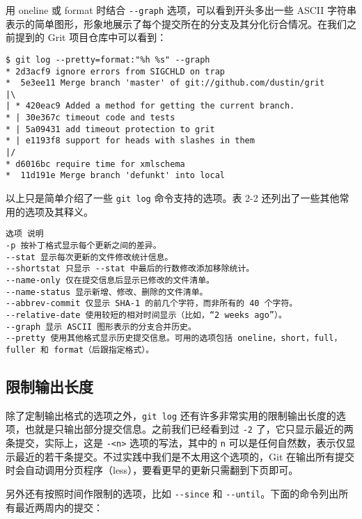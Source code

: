 \documentclass[a4paper]{book}
\begin{document}
用 oneline 或 format 时结合 \texttt{-{}-graph} 选项，可以看到开头多出一些 ASCII 字符串表示的简单图形，形象地展示了每个提交所在的分支及其分化衍合情况。在我们之前提到的 Grit 项目仓库中可以看到：

\begin{shaded}\begin{verbatim}
$ git log --pretty=format:"%h %s" --graph
* 2d3acf9 ignore errors from SIGCHLD on trap
*  5e3ee11 Merge branch 'master' of git://github.com/dustin/grit
|\
| * 420eac9 Added a method for getting the current branch.
* | 30e367c timeout code and tests
* | 5a09431 add timeout protection to grit
* | e1193f8 support for heads with slashes in them
|/
* d6016bc require time for xmlschema
*  11d191e Merge branch 'defunkt' into local
\end{verbatim}\end{shaded}

以上只是简单介绍了一些 \texttt{git log} 命令支持的选项。表 2-2 还列出了一些其他常用的选项及其释义。

\begin{shaded}\begin{verbatim}
选项 说明
-p 按补丁格式显示每个更新之间的差异。
--stat 显示每次更新的文件修改统计信息。
--shortstat 只显示 --stat 中最后的行数修改添加移除统计。
--name-only 仅在提交信息后显示已修改的文件清单。
--name-status 显示新增、修改、删除的文件清单。
--abbrev-commit 仅显示 SHA-1 的前几个字符，而非所有的 40 个字符。
--relative-date 使用较短的相对时间显示（比如，“2 weeks ago”）。
--graph 显示 ASCII 图形表示的分支合并历史。
--pretty 使用其他格式显示历史提交信息。可用的选项包括 oneline，short，full，fuller 和 format（后跟指定格式）。
\end{verbatim}\end{shaded}

\subsection{限制输出长度}

除了定制输出格式的选项之外，\texttt{git log} 还有许多非常实用的限制输出长度的选项，也就是只输出部分提交信息。之前我们已经看到过 \texttt{-2} 了，它只显示最近的两条提交，实际上，这是 \texttt{-\textless{}n\textgreater{}} 选项的写法，其中的 \texttt{n} 可以是任何自然数，表示仅显示最近的若干条提交。不过实践中我们是不太用这个选项的，Git 在输出所有提交时会自动调用分页程序（less），要看更早的更新只需翻到下页即可。

另外还有按照时间作限制的选项，比如 \texttt{-{}-since} 和 \texttt{-{}-until}。下面的命令列出所有最近两周内的提交：
\end{document}
